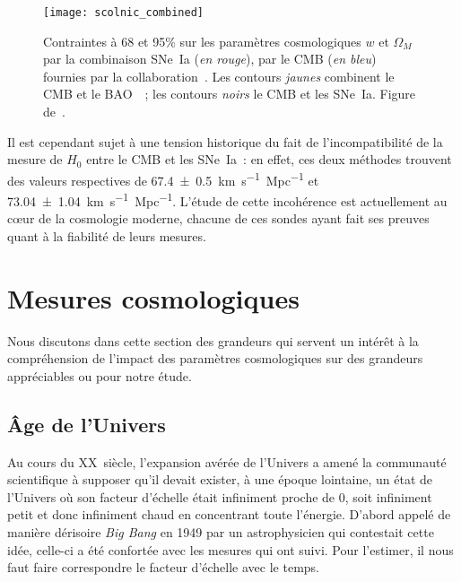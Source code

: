 \documentclass[../main/main.tex]{subfiles}
\begin{document}
\begin{SCfigure}[1][ht]
    \centering
    \texttt{[image: scolnic\_combined]}
    \caption[Contraintes sur les paramètres cosmologiques $w$ et $\Omega_M$ par
    la combinaison SNe~Ia, CMB et BAO]{Contraintes à 68 et 95\% sur les
        paramètres cosmologiques $w$ et $\Omega_M$ par la combinaison SNe~Ia
        (\textit{en rouge}), par le CMB (\textit{en bleu}) fournies par la
        collaboration~\cite{planck2015}. Les contours \textit{jaunes} combinent
        le CMB et le BAO~\citep{alam2015}~; les contours \textit{noirs} le CMB
    et les SNe~Ia. Figure de~\cite{scolnic2018}.}\label{fig:cosmocomb}
\end{SCfigure}

Il est cependant sujet à une tension historique du fait de l'incompatibilité de
la mesure de $H_0$ entre le CMB et les SNe~Ia~: en effet, ces deux méthodes
trouvent des valeurs respectives de \SI{67.4\pm0.5}{km.s^{-1}.Mpc^{-1}} et
\SI{73.04\pm1.04}{km.s^{-1}.Mpc^{-1}}. L'étude de cette incohérence est
actuellement au cœur de la cosmologie moderne, chacune de ces sondes ayant fait
ses preuves quant à la fiabilité de leurs mesures.

\section{Mesures cosmologiques}\label{sec:dist}

Nous discutons dans cette section des grandeurs qui servent un intérêt à la
compréhension de l'impact des paramètres cosmologiques sur des grandeurs
appréciables ou pour notre étude.

\subsection{Âge de l'Univers}\label{ssec:age}

Au cours du XX\ieme~siècle, l'expansion avérée de l'Univers a amené la
communauté scientifique à supposer qu'il devait exister, à une époque lointaine,
un état de l'Univers où son facteur d'échelle était infiniment proche de 0, soit
infiniment petit et donc infiniment chaud en concentrant toute l'énergie.
D'abord appelé de manière dérisoire \textit{Big Bang} en 1949 par un
astrophysicien qui contestait cette idée, celle-ci a été confortée avec les
mesures qui ont suivi. Pour l'estimer, il nous faut faire correspondre le
facteur d'échelle avec le temps.
\end{document}
